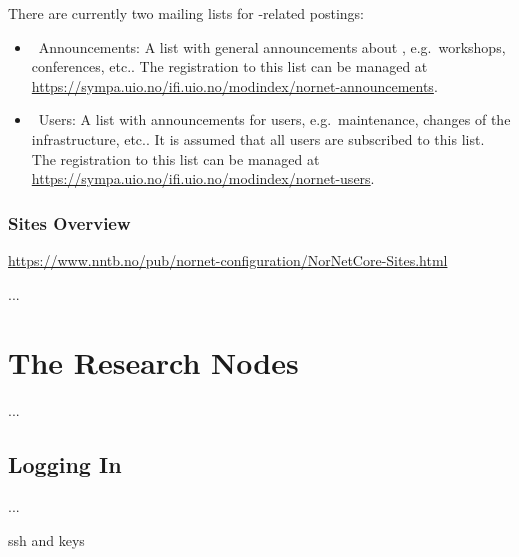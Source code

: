 There are currently two mailing lists for -related postings:

\begin{itemize}
 \item {}~Announcements:
 A list with general announcements about , e.g.\ workshops, conferences, etc..
 The registration to this list can be managed at \url{https://sympa.uio.no/ifi.uio.no/modindex/nornet-announcements}.

 \item {}~Users:
 A list with announcements for  users, e.g.\ maintenance, changes of the infrastructure, etc.. It is assumed that all  users are subscribed to this list.
 The registration to this list can be managed at \url{https://sympa.uio.no/ifi.uio.no/modindex/nornet-users}.
\end{itemize}


\subsection{Sites Overview}

\url{https://www.nntb.no/pub/nornet-configuration/NorNetCore-Sites.html}

...



\chapter{The Research Nodes}
\label{cha:Research-Nodes}

...

\section{Logging In}
\label{sec:Logging-In}

...

ssh and keys



